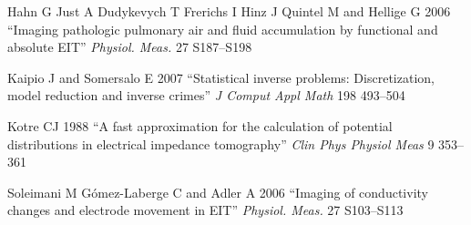 \documentclass[letterpaper,twocolumn,10pt]{article}
\begin{document}
{\begin{list}{}
\item[]
Hahn G Just A Dudykevych T Frerichs I Hinz J Quintel M and Hellige G
2006
``Imaging pathologic pulmonary air and fluid accumulation by functional and absolute EIT''
{\em Physiol. Meas.}
27 S187--S198

\item[]
Kaipio J and Somersalo E 2007
``Statistical inverse problems: Discretization, model reduction and inverse crimes''
{\em J Comput Appl Math}
198 493--504

\item[]
Kotre CJ 1988
``A fast approximation for the calculation of potential distributions in electrical impedance tomography''
{\em Clin Phys Physiol Meas}
9 353--361

\item[]
Soleimani M G\'omez-Laberge C and Adler A 2006
``Imaging of conductivity changes and electrode movement in EIT''
{\em Physiol. Meas.} 27 S103--S113

\end{list}
} \renewcommand{\baselinestretch}{1.0} \normalfont
\end{document}
